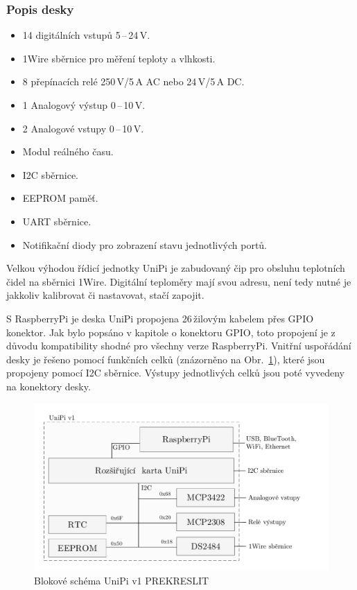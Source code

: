 \subsubsection{Popis desky}
\begin{itemize}
	\item 14 digitálních vstupů 5\,–\,24\,V. 
	\item 1Wire sběrnice pro měření teploty a vlhkosti. 
	\item 8 přepínacích relé 250\,V/5\,A AC nebo 24\,V/5\,A DC.
	\item 1 Analogový výstup 0\,–\,10\,V.
	\item 2 Analogové vstupy 0\,–\,10\,V.
	\item Modul reálného času.
	\item I2C sběrnice.
	\item EEPROM paměť.
	\item UART sběrnice.
	\item Notifikační diody pro zobrazení stavu jednotlivých portů.
\end{itemize}

Velkou výhodou řídicí jednotky UniPi je zabudovaný čip pro obsluhu teplotních čidel na sběrnici 1Wire. Digitální teploměry mají svou adresu, není tedy nutné je jakkoliv kalibrovat či nastavovat, stačí zapojit.

S RaspberryPi je deska UniPi propojena 26\,žilovým kabelem přes GPIO konektor. Jak bylo popsáno v kapitole o konektoru GPIO, toto propojení je z důvodu kompatibility shodné pro všechny verze RaspberryPi. Vnitřní uspořádání desky je řešeno pomocí funkčních celků  (znázorněno na Obr.~\ref{SchemaBlok1}), které jsou propojeny pomocí I2C sběrnice. Výstupy jednotlivých celků jsou poté vyvedeny na konektory desky.
 \begin{figure}[!h]
  \begin{center}
    \includegraphics[scale=0.7]{obrazky/unipi_schema1}
  \end{center}
  \caption{Blokové schéma UniPi v1 \colorbox[rgb]{1,0,0}{PREKRESLIT}}
	\label{SchemaBlok1}
\end{figure}

